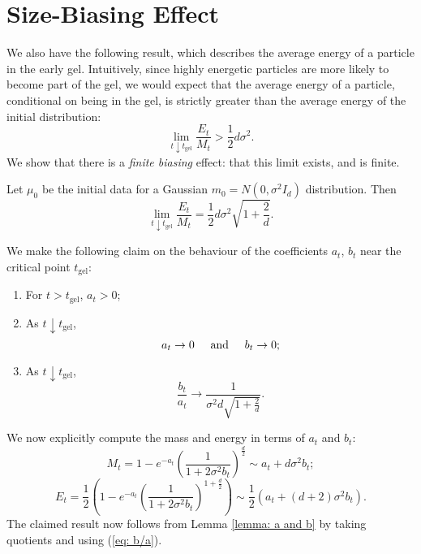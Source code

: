 \section{Size-Biasing Effect}
We also have the following result, which describes the average energy of a particle in the early gel. Intuitively, since highly energetic particles are more likely to become part of the gel, we would expect that the average energy of a particle, conditional on being in the gel, is strictly greater than the average energy of the initial distribution:  \begin{equation}
    \lim_{t\downarrow t_\text{gel}} \frac{E_t}{M_t}>\frac{1}{2}d\sigma^2.
\end{equation}We show that there is a \emph{finite biasing} effect: that this limit exists, and is finite. 
\begin{theorem} Let $\mu_0$ be the initial data for a Gaussian $m_0=N(0, \sigma^2 I_d)$ distribution. Then \begin{equation}
    \lim_{t\downarrow t_\text{gel}}\frac{E_t}{M_t}=\frac{1}{2}d\sigma^2
\sqrt{1+\frac{2}{d}}.
\end{equation} \end{theorem}  We make the following claim on the behaviour of the coefficients $a_t$, $b_t$ near the critical point $t_\text{gel}$: \begin{lemma}\label{lemma: a and b}\begin{enumerate}[label=\roman{*}).]
    \item For $t>t_\text{gel}$, $a_t>0$;
    \item As $t\downarrow t_\text{gel}$, \begin{equation}
        a_t \rightarrow 0 \hspace{0.5cm} \text{and} \hspace{0.5cm} b_t\rightarrow 0;
    \end{equation}
    \item As $t\downarrow t_\text{gel}$, \begin{equation} \label{eq: b/a}
        \frac{b_t}{a_t}\rightarrow \frac{1}{\sigma^2d\sqrt{1+\frac{2}{d}}}.
    \end{equation}
\end{enumerate}  \end{lemma}  We now explicitly compute the mass and energy in terms of $a_t$ and $b_t$:\begin{equation}
    M_t=1-e^{-a_t}\left(\frac{1}{1+2\sigma^2b_t}\right)^\frac{d}{2}\sim a_t+d\sigma^2 b_t;
\end{equation}\begin{equation}
    E_t=\frac{1}{2}\left(1-e^{-a_t}\left(\frac{1}{1+2\sigma^2b_t}\right)^{1+\frac{d}{2}}\right)\sim \frac{1}{2}(a_t+(d+2)\sigma^2 b_t).
\end{equation} The claimed result now follows from Lemma \ref{lemma: a and b} by taking quotients and using (\ref{eq: b/a}). 
